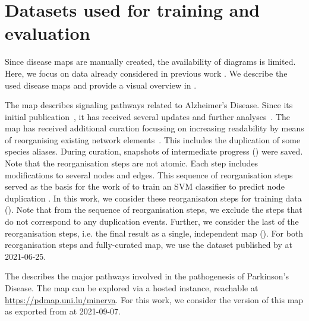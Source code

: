 \documentclass[
	fontsize=10pt, %
	twoside=false, %
	secnumdepth=1, %
  toc=indentunnumbered %
]{kaobook}
\begin{document}
\section{Datasets used for training and evaluation}
\label{sec:datasets-used}

Since disease maps are manually created, the availability of diagrams is
limited.
Here, we focus on data already considered in previous work
\cite{nielsen_MachineLearningSupport_2019}. We describe the used disease maps
and provide a visual overview in .

The  map describes signaling pathways related to Alzheimer's
Disease. Since its initial publication~\cite{mizuno_AlzPathwayComprehensiveMap_2012}, it has received several updates
and further analyses~\cite{ogishima_MapAlzheimerDiseasesignaling_2013,
  ogishima_AlzPathwayUpdatedMap_2016, mizuno_NetworkAnalysisComprehensive_2016}.
%
The map has received additional curation focussing on increasing readability by
means of reorganising existing network elements~\cite{ostaszewski_AlzPathwayRegorganisationSteps_2021}. This includes the
duplication of some species aliases. During curation, snapshots of intermediate
progress () were saved. Note that the reorganisation
steps are not atomic. Each step includes modifications to several nodes and
edges. This sequence of reorganisation steps served as the basis for the work of
\citeauthor{nielsen_MachineLearningSupport_2019} to train an SVM classifier to
predict node duplication \cite{nielsen_MachineLearningSupport_2019}. In this
work, we consider these reorganisaton steps for training data
(\ADMap{}). Note that from the sequence of reorganisation
steps, we exclude the steps that do not correspond to any duplication events.
Further, we consider the last of the reorganisation steps, i.e. the final result
as a single, independent map (\ADLast{}). For both
reorganisation steps and fully-curated map, we use the dataset published by
\citeauthor{ostaszewski_AlzPathwayRegorganisationSteps_2021}
\cite{ostaszewski_AlzPathwayRegorganisationSteps_2021} at 2021-06-25.

The  \cite{fujita_IntegratingPathwaysParkinson_2014} describes the
major pathways involved in the pathogenesis of Parkinson's Disease. The map can
be explored via a hosted  instance, reachable at
\url{https://pdmap.uni.lu/minerva}. For this work, we consider the version of
this map as exported from  at 2021-09-07.
\end{document}
